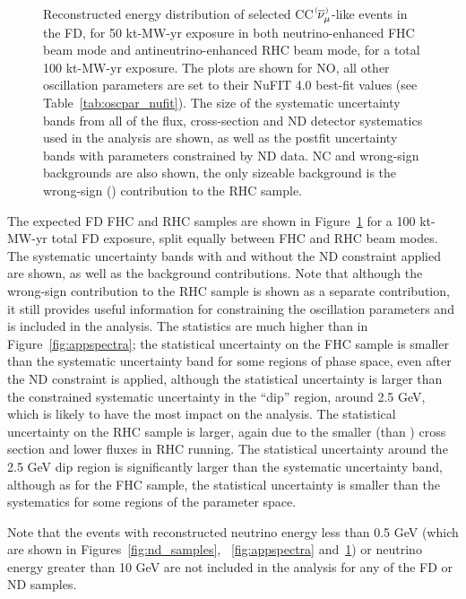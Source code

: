 \begin{figure}[htbp]
  \\
\caption{Reconstructed energy distribution of selected CC $\nu^{\bracketbar}_{\mu}$-like events in the FD, for 50 kt-MW-yr exposure in both neutrino-enhanced FHC beam mode and antineutrino-enhanced RHC beam mode, for a total 100 kt-MW-yr exposure. The plots are shown for NO, all other oscillation parameters are set to their NuFIT 4.0 best-fit values (see Table~\ref{tab:oscpar_nufit}). The size of the systematic uncertainty bands from all of the flux, cross-section and ND detector systematics used in the analysis are shown, as well as the postfit uncertainty bands with parameters constrained by ND data. NC and wrong-sign backgrounds are also shown, the only sizeable background is the wrong-sign (\numu) contribution to the RHC sample.}
\label{fig:disspectra}
\end{figure}
The expected FD FHC \numu and RHC \anumu samples are shown in Figure~\ref{fig:disspectra} for a 100 kt-MW-yr total FD exposure, split equally between FHC and RHC beam modes. The systematic uncertainty bands with and without the ND constraint applied are shown, as well as the background contributions. Note that although the wrong-sign \numu contribution to the RHC \anumu sample is shown as a separate contribution, it still provides useful information for constraining the oscillation parameters and is included in the analysis. The statistics are much higher than in Figure~\ref{fig:appspectra}; the statistical uncertainty on the \numu FHC sample is smaller than the systematic uncertainty band for some regions of phase space, even after the ND constraint is applied, although the statistical uncertainty is larger than the constrained systematic uncertainty in the ``dip'' region, around 2.5 GeV, which is likely to have the most impact on the analysis. The statistical uncertainty on the \anumu RHC sample is larger, again due to the smaller \anumu (than \numu) cross section and lower fluxes in RHC running. The statistical uncertainty around the 2.5 GeV dip region is significantly larger than the systematic uncertainty band, although as for the FHC \numu sample, the statistical uncertainty is smaller than the systematics for some regions of the parameter space.

Note that the events with reconstructed neutrino energy less than 0.5 GeV (which are shown in Figures~\ref{fig:nd_samples}, ~\ref{fig:appspectra} and~\ref{fig:disspectra}) or neutrino energy greater than 10 GeV are not included in the analysis for any of the FD or ND samples.



